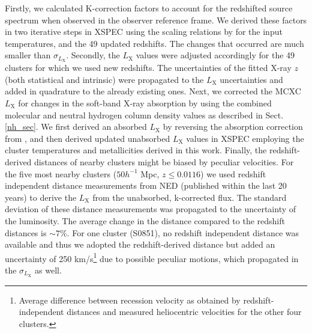\documentclass{aa}   %
\begin{document}
Firstly, we calculated K-correction factors to account for the redshifted source spectrum when observed in the observer reference frame. We derived these factors in two iterative steps in XSPEC using the scaling relations by \citet{reichert} for the input temperatures, and the 49 updated redshifts. The changes that occurred are much smaller than $\sigma_{L_{\text{X}}}$.
Secondly, the $L_{\text{X}}$ values were adjusted accordingly for the 49 clusters for which we used new redshifts. The uncertainties of the fitted X-ray $z$ (both statistical and intrinsic) were propagated to the $L_{\text{X}}$ uncertainties and added in quadrature to the already existing ones. Next, we corrected the MCXC $L_{\text{X}}$ for changes in the soft-band X-ray absorption by using the combined molecular and neutral hydrogen column density values as described in Sect. \ref{nh_sec}. We first derived an absorbed $L_{\text{X}}$ by reversing the absorption correction from \citet{mcxc}, and then derived updated unabsorbed $L_{\text{X}}$ values in XSPEC employing the cluster temperatures and metallicities derived in this work.
Finally, the redshift-derived distances of nearby clusters might be biased by peculiar velocities. For the five most nearby clusters ($50h^{-1}$ Mpc, $z\leq 0.0116$) we used redshift independent distance measurements from NED (published within the last 20 years) to derive the $L_{\text{X}}$ from the unabsorbed, k-corrected flux. The standard deviation of these distance measurements was propagated to the uncertainty of the luminosity. The average change in the distance compared to the redshift distances is $\sim 7\%$. For one cluster (S0851), no redshift independent distance was available and thus we adopted the redshift-derived distance but added an uncertainty of 250 km/s\footnote{Average difference between recession velocity as obtained by redshift-independent distances and measured heliocentric velocities for the other four clusters.} due to possible peculiar motions, which propagated in the $\sigma_{L_{\text{X}}}$ as well.



\end{document}
